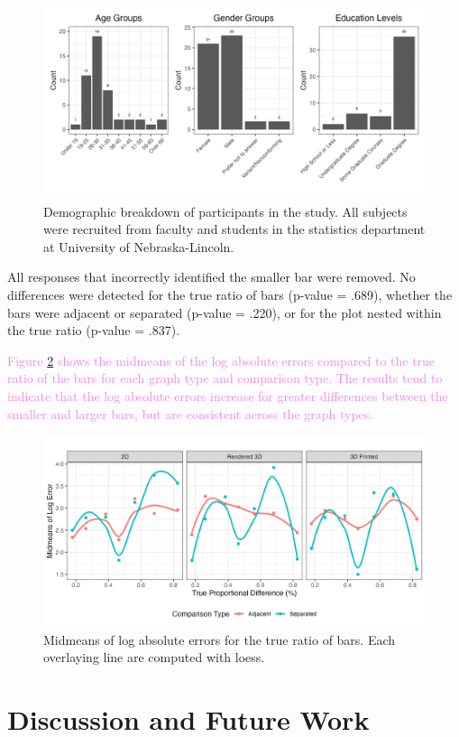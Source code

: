 \documentclass[letterpaper,inpress,dvipsnames]{jdsart}
\begin{document}
\begin{figure}
\includegraphics[width=0.85\linewidth]{demographic-plots} \caption{Demographic breakdown of participants in the study. All subjects were recruited from faculty and students in the statistics department at University of Nebraska-Lincoln.}\label{fig:demographics}
\end{figure}

All responses that incorrectly identified the smaller bar were removed.
No differences were detected for the true ratio of bars (p-value = .689), whether the bars were adjacent or separated (p-value = .220), or for the plot nested within the true ratio (p-value = .837).

{\textcolor{Violet}{Figure}} \ref{fig:midmeans-log-errors} {\textcolor{Violet}{shows the midmeans of the log absolute errors compared to the true ratio of the bars for each graph type and comparison type. The results tend to indicate that the log absolute errors increase for greater differences between the smaller and larger bars, but are consistent across the graph types.}}

\begin{figure}
\includegraphics[width=0.8\linewidth]{log-error-midmeans} \caption{Midmeans of log absolute errors for the true ratio of bars. Each overlaying line are computed with loess.}\label{fig:midmeans-log-errors}
\end{figure}

\hypertarget{discussion-and-future-work}{%
\section{Discussion and Future Work}\label{discussion-and-future-work}}
\end{document}
